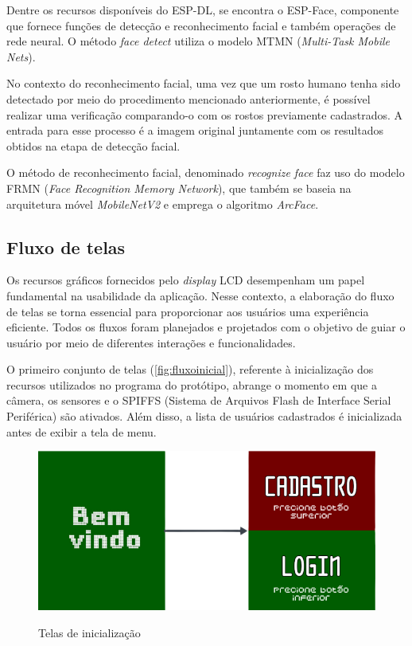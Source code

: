 Dentre os recursos disponíveis do ESP-DL, se encontra o 
ESP-Face, componente que fornece funções de detecção e 
reconhecimento facial e também operações de rede neural. 
O método \textit{face detect} utiliza o modelo MTMN (\textit{Multi-Task 
Mobile Nets}).

No contexto do reconhecimento facial, uma vez que um rosto 
humano tenha sido detectado por meio do procedimento 
mencionado anteriormente, é possível realizar uma verificação 
comparando-o com os rostos previamente cadastrados. 
A entrada para esse processo é a imagem original juntamente 
com os resultados obtidos na etapa de detecção facial.

O método de reconhecimento facial, denominado \textit{recognize face}  
faz uso do modelo FRMN (\textit{Face Recognition Memory Network}), que 
também se baseia na arquitetura móvel \textit{MobileNetV2} e emprega o 
algoritmo \textit{ArcFace}.

\subsection{Fluxo de telas}\label{sec:telas}

Os recursos gráficos fornecidos pelo \textit{display} LCD desempenham um papel 
fundamental na usabilidade da aplicação. Nesse contexto, a elaboração 
do fluxo de telas se torna essencial para proporcionar aos usuários 
uma experiência eficiente. Todos os fluxos foram planejados e 
projetados com o objetivo de guiar o usuário por meio 
de diferentes interações e funcionalidades.

O primeiro conjunto de telas (\autoref{fig:fluxoinicial}), referente à 
inicialização dos recursos utilizados no programa do protótipo, 
abrange o momento em que a câmera, os sensores e o SPIFFS 
(Sistema de Arquivos Flash de Interface Serial Periférica) 
são ativados. Além disso, a lista de usuários cadastrados é 
inicializada antes de exibir a tela de menu.

\begin{figure}[h!]
    \centering
    \caption{Telas de inicialização}
    \includegraphics[scale=0.25]{figuras/fluxo_inicial.png}
    \fonte{}%
    \label{fig:fluxoinicial}
    \centering
\end{figure}

